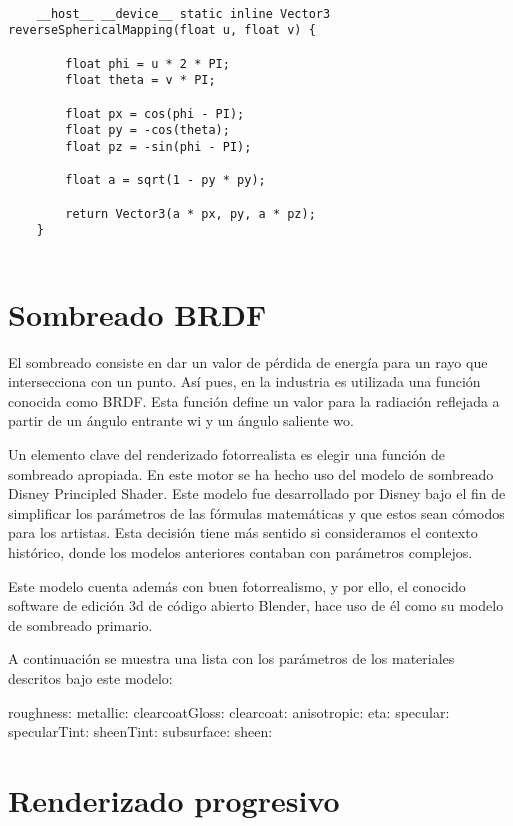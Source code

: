 	\begin{lstlisting}
		
	__host__ __device__ static inline Vector3 reverseSphericalMapping(float u, float v) {

        float phi = u * 2 * PI;
        float theta = v * PI;

        float px = cos(phi - PI);
        float py = -cos(theta);
        float pz = -sin(phi - PI);

        float a = sqrt(1 - py * py);

        return Vector3(a * px, py, a * pz);
    }
	
	\end{lstlisting}
	
	\section{Sombreado BRDF}
	
		
	El sombreado consiste en dar un valor de pérdida de energía para un rayo que intersecciona con un punto. Así pues, en la industria es utilizada una función conocida como BRDF. Esta función define un valor para la radiación reflejada a partir de un ángulo entrante wi y un ángulo saliente wo.

	Un elemento clave del renderizado fotorrealista es elegir una función de sombreado apropiada. En este motor se ha hecho uso del modelo de sombreado Disney Principled Shader. Este modelo fue desarrollado por Disney bajo el fin de simplificar los parámetros de las fórmulas matemáticas y que estos sean cómodos para los artistas. Esta decisión tiene más sentido si consideramos el contexto histórico, donde los modelos anteriores contaban con parámetros complejos.

	Este modelo cuenta además con buen fotorrealismo, y por ello, el conocido software de edición 3d de código abierto Blender, hace uso de él como su modelo de sombreado primario.


	A continuación se muestra una lista con los parámetros de los materiales descritos bajo este modelo:

	roughness:
	metallic:
	clearcoatGloss:
	clearcoat:
	anisotropic:
	eta:
	specular:
	specularTint:
	sheenTint:
	subsurface:
	sheen:


	
	\section{Renderizado progresivo}
		
